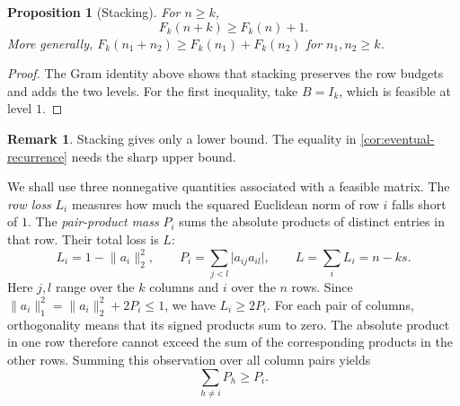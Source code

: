 \documentclass[11pt]{article}
\numberwithin{equation}{section}
\newtheorem{proposition}[proposition]{Proposition}
\theoremstyle{definition}
\theoremstyle{definition}
\newtheorem{remark}[remark]{Remark}
\newcommand{\abs}[1]{\lvert#1\rvert}
\newcommand{\norm}[1]{\lVert#1\rVert}
\begin{document}
\begin{proposition}[Stacking]\label{prop:stacking}
For $n\ge k$,
\[
 F_k(n+k)\ge F_k(n)+1.
\]
More generally, $F_k(n_1+n_2)\ge F_k(n_1)+F_k(n_2)$ for $n_1,n_2\ge k$.
\end{proposition}
\begin{proof}
The Gram identity above shows that stacking preserves the row budgets
and adds the two levels. For the first inequality, take $B=I_k$,
which is feasible at level $1$.
\end{proof}

\begin{remark}
Stacking gives only a lower bound.  The equality in
\cref{cor:eventual-recurrence} needs the sharp upper bound.
\end{remark}

We shall use three nonnegative quantities associated with a feasible
matrix. The \emph{row loss} $L_i$ measures how much the squared
Euclidean norm of row $i$ falls short of $1$. The \emph{pair-product
mass} $P_i$ sums the absolute products of distinct entries in that
row. Their total loss is $L$:
\[
 L_i=1-\norm{a_i}_2^2,\qquad
 P_i=\sum_{j<l}\abs{a_{ij}a_{il}},\qquad L=\sum_iL_i=n-ks.
\]
Here $j,l$ range over the $k$ columns and $i$ over the $n$ rows.
Since $\norm{a_i}_1^2=\norm{a_i}_2^2+2P_i\le1$,
we have $L_i\ge2P_i$.
For each pair of columns, orthogonality means that its signed products
sum to zero. The absolute product in one row therefore cannot exceed
the sum of the corresponding products in the other rows.
Summing this observation over all column pairs yields
\begin{equation}\label{eq:cancellation}
 \sum_{h\ne i}P_h\ge P_i.
\end{equation}
\end{document}
